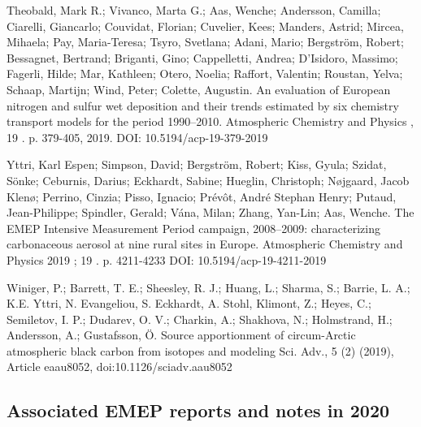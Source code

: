 \begin{list}{}{\setlength{\leftmargin}{15pt}\setlength{\itemindent}{-\leftmargin}}
\item[]
Theobald, Mark R.; Vivanco, Marta G.; Aas, Wenche; Andersson, Camilla; Ciarelli, Giancarlo; Couvidat, Florian; Cuvelier, Kees; Manders, Astrid; Mircea, Mihaela; Pay, Maria-Teresa; Tsyro, Svetlana; Adani, Mario; Bergström, Robert; Bessagnet, Bertrand; Briganti, Gino; Cappelletti, Andrea; D'Isidoro, Massimo; Fagerli, Hilde; Mar, Kathleen; Otero, Noelia; Raffort, Valentin; Roustan, Yelva; Schaap, Martijn; Wind, Peter; Colette, Augustin.
An evaluation of European nitrogen and sulfur wet deposition and their trends estimated by six chemistry transport models for the period 1990–2010.
Atmospheric Chemistry and Physics , 19 . p. 379-405, 2019.
DOI: 10.5194/acp-19-379-2019

\item[]
Yttri, Karl Espen; Simpson, David; Bergström, Robert; Kiss, Gyula; Szidat, Sönke; Ceburnis, Darius; Eckhardt, Sabine; Hueglin, Christoph; Nøjgaard, Jacob Klenø; Perrino, Cinzia; Pisso, Ignacio; Prévôt, André Stephan Henry; Putaud, Jean-Philippe; Spindler, Gerald; Vána, Milan; Zhang, Yan-Lin; Aas, Wenche.
The EMEP Intensive Measurement Period campaign, 2008–2009: characterizing carbonaceous aerosol at nine rural sites in Europe.
Atmospheric Chemistry and Physics 2019 ; 19 . p. 4211-4233
DOI: 10.5194/acp-19-4211-2019

\item[]
Winiger, P.; Barrett, T. E.; Sheesley, R. J.; Huang, L.; Sharma, S.; Barrie, L. A.; K.E. Yttri, N. Evangeliou, S. Eckhardt, A. Stohl, Klimont, Z.; Heyes, C.; Semiletov, I. P.; Dudarev, O. V.; Charkin, A.; Shakhova, N.; Holmstrand, H.; Andersson, A.; Gustafsson, Ö.
Source apportionment of circum-Arctic atmospheric black carbon from isotopes and modeling
Sci. Adv., 5 (2) (2019), Article eaau8052, doi:10.1126/sciadv.aau8052

\end{list}


\subsection*{Associated EMEP reports and notes in 2020}

\vspace{0.5cm}

